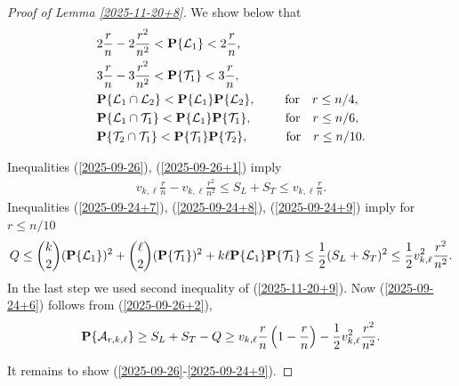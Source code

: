 \documentclass[11pt, a4paper]{article}
\newcommand{\PP}{{\bf{P}}}
\begin{document}
\begin{proof}[Proof of Lemma \ref{2025-11-20+8}]
 
 We show below that
 \begin{align}
 \label{2025-09-26}
  &
  2\frac{r}{n}-2\frac{r^2}{n^2}
  <
 \PP\{{\cal L}_1\}
 <
 2\frac{r}{n},
 \\
 \label{2025-09-26+1}
 &
  3\frac{r}{n}-3\frac{r^2}{n^2}
 <
  \PP\{{\cal T}_1\}
  < 
 3\frac{r}{n},
 \\
 \label{2025-09-24+7}
  &
  \PP\{{\cal L}_1\cap {\cal L}_2\}
  <
  \PP\{{\cal L}_1\}
  \PP\{{\cal L}_2\},
  \qquad
  \
 {\text{for}}
 \quad
 r\le n/4,
 \\
 \label{2025-09-24+8}
 &  
 \PP\{{\cal L}_1\cap {\cal T}_1\}< \PP\{{\cal L}_1\}\PP\{{\cal T}_1\},
 \qquad
 \
 \
 {\text{for}}
 \quad
 r\le n/6,
  \\
  \label{2025-09-24+9}
  &
  \PP\{{\cal T}_2\cap {\cal T}_1\}<\PP\{{\cal T}_1\} \PP\{{\cal T}_2\},
  \qquad
  \
  \
  \
 {\text{for}}
 \quad
  r\le n/10.
  \end{align}
 
 Inequalities  (\ref{2025-09-26}),  (\ref{2025-09-26+1}) imply
 \begin{align}
\label{2025-11-20+9}
 v_{k,\ell}
 \frac{r}{n}
 -
 v_{k,\ell}\frac{r^2}{n^2}
 \le
 S_L+S_T
 \le
 v_{k,\ell}\frac{r}{n}.
 \end{align}
 Inequalities 
 (\ref{2025-09-24+7}),
 (\ref{2025-09-24+8}),
(\ref{2025-09-24+9}) imply for $r\le n/10$
\begin{align*}
Q
\le 
\binom{k}{2}
(\PP\{{\cal L}_1\})^2
+ 
\binom{\ell}{2}
(\PP\{{\cal T}_1\})^2
+
k\ell \PP\{{\cal L}_1\}\PP\{{\cal T}_1\}
\le 
\frac{1}{2}(S_L+S_T)^2
\le
\frac{1}{2} 
v_{k,\ell}^2\frac{r^2}{n^2}.
\end{align*}
In the last step we used second inequality of (\ref{2025-11-20+9}). Now (\ref{2025-09-24+6}) follows 
from (\ref{2025-09-26+2}),
\begin{align}
\nonumber
\PP\{{\cal A}_{r,k,\ell}\}
\ge 
S_L+S_T-Q
\ge
v_{k,\ell}\frac{r}{n}
\left(1-\frac{r}{n}\right)
-
\frac{1}{2}
v_{k,\ell}^2\frac{r^2}{n^2}.
\end{align}

It remains to show (\ref{2025-09-26}-\ref{2025-09-24+9}).

























\end{proof}
\end{document}
